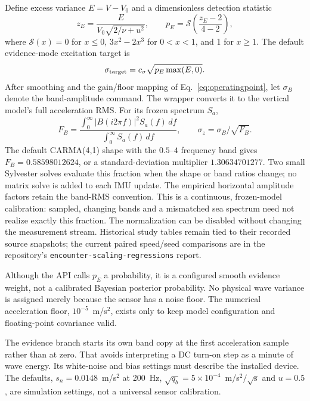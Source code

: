 \documentclass[conference]{IEEEtran}
\begin{document}
Define excess variance $E=V-V_0$ and a dimensionless detection statistic
\begin{equation}
 z_E=\frac{E}{V_0\sqrt{2/\nu+u^2}},\qquad
 p_E=\mathcal S\!\left(\frac{z_E-2}{4-2}\right),
 \label{eq:evidence}
\end{equation}
where $\mathcal S(x)=0$ for $x\le0$, $3x^2-2x^3$ for $0<x<1$, and
1 for $x\ge1$. The default evidence-mode excitation target is
\begin{equation}
 \sigma_{\rm target}=c_\sigma\sqrt{p_E\max(E,0)}.
 \label{eq:sigmatarget}
\end{equation}
After smoothing and the gain/floor mapping of Eq.~\eqref{eq:operatingpoint},
let $\sigma_B$ denote the band-amplitude command. The wrapper converts it
to the vertical model's full acceleration RMS. For its frozen spectrum $S_a$,
\begin{equation}
 F_B=\frac{\int_0^\infty |B(i2\pi f)|^2 S_a(f)\,df}
               {\int_0^\infty S_a(f)\,df},\qquad
 \sigma_z=\sigma_B/\sqrt{F_B}.
 \label{eq:bandnormalization}
\end{equation}
The default CARMA(4,1) shape with the $0.5$--$4$ frequency band gives
$F_B=0.58598012624$, or a standard-deviation multiplier $1.30634701277$.
Two small Sylvester solves evaluate this fraction when the shape or band
ratios change; no matrix solve is added to each IMU update. The empirical
horizontal amplitude factors retain the band-RMS convention. This is a
continuous, frozen-model calibration: sampled, changing bands and a
mismatched sea spectrum need not realize exactly this fraction. The
normalization can be disabled without changing the measurement stream.
Historical study tables remain tied to their recorded source snapshots;
the current paired speed/seed comparisons are in the repository's
\texttt{encounter-scaling-regressions} report.

Although the API calls $p_E$ a probability, it is a configured smooth
evidence weight, not a calibrated Bayesian posterior probability.
No physical wave variance is assigned merely because the sensor has a
noise floor. The numerical acceleration floor, $10^{-5}$~m/s$^2$, exists
only to keep model configuration and floating-point covariance valid.

The evidence branch starts its own band copy at the first acceleration
sample rather than at zero. That avoids interpreting a DC turn-on step as
a minute of wave energy. Its white-noise and bias settings must describe
the installed device. The defaults, $s_n=0.0148$~m/s$^2$ at 200~Hz,
$\sqrt{q_b}=5\times10^{-4}$~m/s$^2/\sqrt{\mathrm s}$ and $u=0.5$, are
simulation settings, not a universal sensor calibration.
\end{document}
